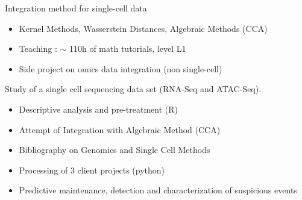 \documentclass[10pt,a4paper]{altacv}
\begin{document}

 Integration method for single-cell data
\begin{itemize}
\item Kernel Methods, Wasserstein Distances, Algebraic Methods (CCA)
\item Teaching : $\sim$ 110h of math tutorials, level L1
\item Side project on omics data integration (non single-cell)
\end{itemize}

Study of a single cell sequencing data set (RNA-Seq and ATAC-Seq). 
\begin{itemize}
\item Descriptive analysis and pre-treatment (R) 
\item Attempt of Integration with Algebraic Method (CCA) 
\item Bibliography on Genomics and Single Cell Methods
\end{itemize}

{}

\begin{itemize}
\item Processing of 3 client projects (python)
\item Predictive maintenance, detection and characterization of suspicious events
\end{itemize}
\end{document}
